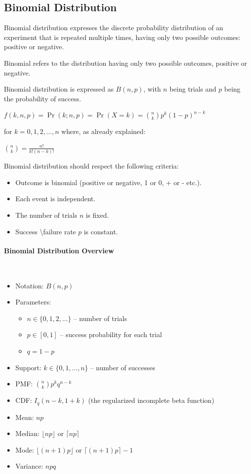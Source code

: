 \documentclass{article}
\begin{document}
\subsection{Binomial Distribution}
Binomial distribution expresses the discrete probability distribution of an experiment that is repeated multiple times, having only two possible outcomes: positive or negative. 

Binomial refers to the distribution having only two possible outcomes, positive or negative. 

Binomial distribution is expressed as $B(n,p)$, with $n$ being trials and $p$ being the probability of success. 

$ \displaystyle f(k,n,p)=\Pr(k;n,p)=\Pr(X=k)={\binom {n}{k}}p^{k}(1-p)^{n-k}$

for $k = 0, 1, 2, \ldots, n$ where, as already explained:

$ \displaystyle {\binom {n}{k}}={\frac {n!}{k!(n-k)!}}$

Binomial distribution should respect the following criteria:
\begin{itemize}
    \item Outcome is binomial (positive or negative, 1 or 0, + or - etc.).
    \item Each event is independent.
    \item The number of trials $n$ is fixed.
    \item Success \textbackslash failure rate $p$ is constant.
\end{itemize}

\paragraph{Binomial Distribution Overview}\mbox{} \\

\begin{itemize}
    \item Notation: $B(n,p)$
    \item Parameters: 
        \begin{itemize}
            \item $ \displaystyle n\in \{0,1,2,\ldots \} $ – number of trials 
            \item $ \displaystyle p\in [0,1] $ – success probability for each trial
            \item $ {\displaystyle q=1-p} $
        \end{itemize}
    \item Support: $ \displaystyle k\in \{0,1,\ldots ,n\}$ – number of successes 
    \item PMF: $ \displaystyle {\binom {n}{k}}p^{k}q^{n-k} $
    \item CDF: $ \displaystyle I_{q}(n-k,1+k) $ (the regularized incomplete beta function)
    \item Mean: $np$
    \item Median: $\lfloor np \rfloor$  or $\lceil np \rceil $
    \item Mode: $\lfloor (n+1)p \rfloor$  or $\lceil (n+1)p \rceil-1 $
    \item Variance: $npq$ 
\end{itemize}
\end{document}
